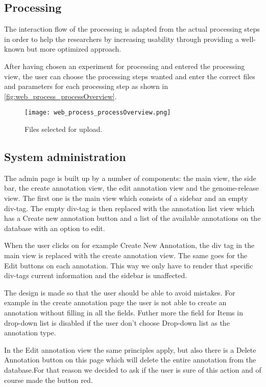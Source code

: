 \subsection{Processing}
The interaction flow of the processing is adapted from the actual processing 
steps in order to help the researchers by increasing usability through providing
a well-known but more optimized approach.

After having chosen an experiment for processing and entered the processing 
view, the user can choose the processing steps wanted and enter the correct
files and parameters for each processing step as shown in 
\autoref{fig:web_process_processOverview}.

\begin{figure}[h]
    \centering
    \texttt{[image: web\_process\_processOverview.png]}
    \caption{Files selected for upload.}
    \label{fig:web_process_processOverview}
\end{figure}

\subsection{System administration}
The admin page is built up by a number of components: the main view, the side bar, the create annotation view, the edit annotation view and the genome-release view. The first one is the main view which consists of a sidebar and an empty div-tag. The empty div-tag is then replaced with the annotation list view which has a Create new annotation button and a list of the available annotations on the database with an option to edit. 

When the user clicks on for example Create New Annotation, the div tag in the main view is replaced with the create annotation view. The same goes for the Edit buttons on each annotation. This way we only have to render that specific div-tags current information and the sidebar is unaffected. 

The design is made so that the user should be able to avoid mistakes. For example in the create annotation page the user is not able to create an annotation without filling in all the fields. Futher more the field for Items in drop-down list is disabled if the user don't choose Drop-down list as the annotation type. 

In the Edit annotation view the same principles apply, but also there is a Delete Annotation button on this page which will delete the entire annotation from the database.For that reason we decided to ask if the user is sure of this action and of course made the button red.

